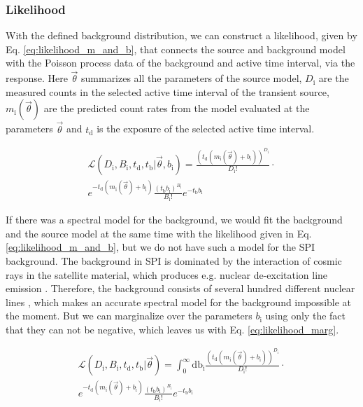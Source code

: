 \documentclass[twocolumn,traditabstract]{aa}
\begin{document}


\subsubsection{Likelihood}

With the defined background distribution, we can construct a likelihood, given by Eq. \ref{eq:likelihood_m_and_b}, that connects the source and background model with the Poisson process data of the background and active time interval, via the response. Here $\vec{\theta}$ summarizes all the parameters of the source model, $D_{\mathrm{i}}$ are the measured counts in the selected active time interval of the transient source, $m_{\mathrm{i}}(\vec{\theta})$ are the predicted count rates from the model evaluated at the parameters $\vec{\theta}$ and $t_{\mathrm{d}}$ is the exposure of the selected active time interval.

\begin{multline}
	\mathcal{L}(D_{\mathrm{i}}, B_{\mathrm{i}},t_{\mathrm{d}},t_{\mathrm{b}}|\vec{\theta}, b_{\mathrm{i}}) = \frac{(t_{\mathrm{d}}(m_{\mathrm{i}}(\vec{\theta})+ b_{\mathrm{i}}))^{D_{\mathrm{i}}}}{D_{\mathrm{i}}!}\cdot \\
  e^{-t_{\mathrm{d}}(m_{\mathrm{i}}(\vec{\theta})+b_{\mathrm{i}})}\frac{(t_{\mathrm{b}} b_{\mathrm{i}})^{B_{\mathrm{i}}}}{B_{\mathrm{i}}!} e^{-t_{\mathrm{b}} b_{\mathrm{i}}}
  \label{eq:likelihood_m_and_b}
\end{multline}

\noindent
If there was a spectral model for the background, we would fit the background and the source model at the same time with the likelihood given in Eq. \ref{eq:likelihood_m_and_b}, but we do not have such a model for the SPI background. The background in SPI is dominated by the interaction of cosmic rays in the satellite material, which produces e.g. nuclear de-excitation line emission \citep{spi_bkg}. Therefore, the background consists of several hundred different nuclear lines \citep{spi_bkg}, which makes an accurate spectral model for the background impossible at the moment. But we can marginalize over the parameters $b_{\mathrm{i}}$ using only the fact that they can not be negative, which leaves us with Eq. \ref{eq:likelihood_marg}.

\begin{multline}
	\mathcal{L}(D_{\mathrm{i}}, B_{\mathrm{i}},t_{\mathrm{d}},t_{\mathrm{b}}|\vec{\theta}) = \int_{0}^{\infty}\textrm{db}_{\mathrm{i}}\frac{(t_{\mathrm{d}}(m_{\mathrm{i}}(\vec{\theta})+ b_{\mathrm{i}}))^{D_{\mathrm{i}}}}{D_{\mathrm{i}}!}\cdot\\
  e^{-t_{\mathrm{d}}(m_{\mathrm{i}}(\vec{\theta})+b_{\mathrm{i}})} \frac{(t_{\mathrm{b}} b_{\mathrm{i}})^{B_{\mathrm{i}}}}{B_{\mathrm{i}}!} e^{-t_{\mathrm{b}}b_{\mathrm{i}}}
  \label{eq:likelihood_marg}
\end{multline}
\end{document}
